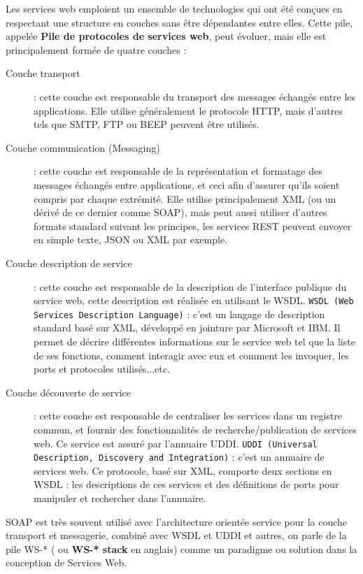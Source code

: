 Les services web emploient un ensemble de technologies qui ont été conçues en respectant une structure en couches sans être dépendantes entre elles. Cette pile, appelée \textbf{Pile de protocoles de services web}, peut évoluer, mais elle est principalement formée de quatre couches \cite{refTutorialPointsWS} :
\begin{description}
	\item[Couche transport] : cette couche est responsable du transport des messages échangés entre les applications. Elle utilise généralement le protocole HTTP, mais d'autres tels que SMTP, FTP ou BEEP peuvent être utilisés.
	\item [Couche communication (Messaging)] : cette couche est responsable de la représentation et formatage des messages échangés entre applications, et ceci afin d'assurer qu'ils soient compris par chaque extrémité. Elle utilise principalement XML (ou un dérivé de ce dernier comme SOAP), mais peut aussi utiliser d'autres formats standard suivant les principes, les services REST peuvent envoyer en simple texte, JSON ou XML par exemple.
	\item[Couche description de service] : cette couche est responsable de la description de l'interface publique du service web, cette description est réalisée en utilisant le WSDL.\newline
	      \texttt{WSDL (Web Services Description Language)} : c'est un langage de description standard basé sur XML, développé en jointure par Microsoft et IBM. Il permet de décrire différentes informations sur le service web tel que la liste de ses fonctions, comment interagir avec eux et comment les invoquer, les ports et protocoles utilisés...etc.
	\item[Couche découverte de service] : cette couche est responsable de centraliser les services dans un registre commun, et fournir des fonctionnalités de recherche/publication de services web. Ce service est assuré par l'annuaire UDDI.\newline
	      \texttt{UDDI (Universal Description, Discovery and Integration)} : c'est un annuaire de services web. Ce protocole, basé sur XML, comporte deux sections en WSDL : les descriptions de ces services et des définitions de ports pour manipuler et rechercher dans l'annuaire.
\end{description}

SOAP est très souvent utilisé avec l'architecture orientée service pour la couche transport et messagerie, combiné avec WSDL et UDDI et autres, on parle de la pile WS-* ( ou \textbf{WS-* stack} en anglais) comme un paradigme ou solution dans la conception de Services Web.

